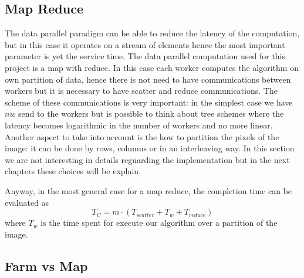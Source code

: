 \subsection{Map Reduce}

The data parallel paradigm can be able to reduce the latency of the computation, but in this case it operates on a stream of elements hence the most important parameter is yet the service time. The data parallel computation used for this project is a map with reduce. In this case each worker computes the algorithm on own partition of data, hence there is not need to have communications between workers but it is necessary to have scatter and reduce communications. The scheme of these communications is very important: in the simplest case we have $nw$ send to the workers but is possible to think about tree schemes where the latency becomes logarithmic in the number of workers and no more linear. Another aspect to take into account is the how to partition the pixels of the image: it can be done by rows, columns or in an interleaving way. In this section we are not interesting in details reguarding the implementation but in the next chapters these choices will be explain.

Anyway, in the most general case for a map reduce, the completion time can be evaluated as
\[
T_{C} = m \cdot (T_{scatter} + T_{w} + T_{reduce})
\]
where $T_{w}$ is the time spent for execute our algorithm over a partition of the image.
\subsection{Farm vs Map}
